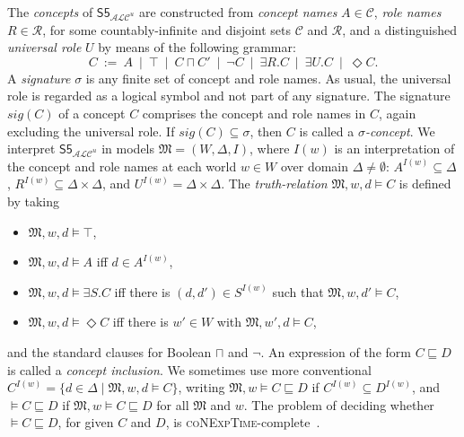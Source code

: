 \documentclass{lmcs} %
\theoremstyle{plain}\newtheorem{satz}[thm]{Satz} %
\newcommand{\sig}{\mathit{sig}}
\newcommand{\ALCIOS}{\ensuremath{\mathsf{S5}_{\mathcal{ALC}^u}}}
\begin{document}
The \emph{concepts} of $\ALCIOS$ are constructed from \emph{concept names} $A \in \mathcal{C}$, \emph{role names} $R \in \mathcal{R}$, 
for some countably-infinite and disjoint sets $\mathcal{C}$ and $\mathcal{R}$, 
and a distinguished \emph{universal role} $U$ by means of the following grammar: 
%
\[
C  ~:=~  A \ \mid  \ \top \ \mid \ C \sqcap C'  \ \mid \ \neg C \ \mid \ \exists R.C \ \mid \ \exists U.C \ \mid \ \Diamond C.
\]
%
A \emph{signature} $\sigma$ is any finite set of concept and role names. As usual, the universal role is regarded as a logical symbol and not part of any signature. The signature $\sig(C)$ of a concept $C$ comprises the concept and role names in $C$, again excluding the universal role. If $\sig(C)\subseteq \sigma$, then $C$ is called a \emph{$\sigma$-concept}.
%
We interpret $\ALCIOS$ in models $\mathfrak{M} = (W,\Delta,I)$, where $I(w)$ is an interpretation of the concept and role names at each world $w\in W$ over domain $\Delta \ne\emptyset$: $A^{I(w)}\subseteq \Delta$, $R^{I(w)} \subseteq \Delta \times \Delta$, and $U^{I(w)} = \Delta \times \Delta$. 
%
The \emph{truth-relation} $\mathfrak{M},w,d\models C$ is defined by taking
%
\begin{itemize}
	\item[--] $\mathfrak M, w, d \models \top$, 
	
	\item[--] $\mathfrak M, w, d \models A$ iff $d \in A^{I(w)}$,  
	
	
	\item[--] $\mathfrak M, w, d \models \exists S.C$ iff there is $(d,d') \in S^{I(w)}$ such that $\mathfrak M, w, d' \models C$, 
	
	\item[--] $\mathfrak M, w, d \models \Diamond C$ iff there is $w' \in W$ with $\mathfrak M, w', d \models C$,
\end{itemize}
%
and the standard clauses for Boolean $\sqcap$ and $\neg$. An expression of the form $C \sqsubseteq D$ is called a \emph{concept inclusion}.
%
We sometimes use more conventional  
%
$C^{I(w)} = \{ d\in \Delta \mid \mathfrak{M},w,d\models C\}$,  
%
writing $\mathfrak{M},w\models C \sqsubseteq D$ if $C^{I(w)} \subseteq D^{I(w)}$, and \mbox{$\models C \sqsubseteq D$} if $\mathfrak{M},w\models C \sqsubseteq D$ for all $\mathfrak{M}$ and $w$. The problem of deciding whether $\models C \sqsubseteq D$, for given $C$ and $D$, is \textsc{coNExpTime}-complete~\cite{GabEtAl03}. 
\end{document}
